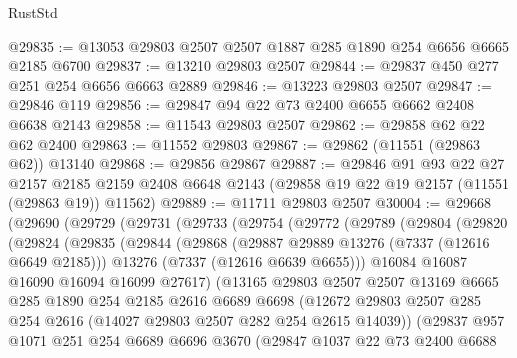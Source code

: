 \begin{lexlean}{RustStd}
\begin{coremodule}
@29835 := @13053 @29803 @2507 @2507 @1887 @285 @1890 @254 @6656 @6665 @2185 @6700
@29837 := @13210 @29803 @2507
@29844 := @29837 @450 @277 @251 @254 @6656 @6663 @2889
@29846 := @13223 @29803 @2507
@29847 := @29846 @119
@29856 := @29847 @94 @22 @73 @2400 @6655 @6662 @2408 @6638 @2143
@29858 := @11543 @29803 @2507
@29862 := @29858 @62 @22 @62 @2400
@29863 := @11552 @29803
@29867 := @29862 (@11551 (@29863 @62)) @13140
@29868 := @29856 @29867
@29887 := @29846
    @91
    @93
    @22
    @27
    @2157
    @2185
    @2159
    @2408
    @6648
    @2143
    (@29858 @19 @22 @19 @2157 (@11551 (@29863 @19)) @11562)
@29889 := @11711 @29803 @2507
@30004 := @29668
    (@29690
      (@29729
        (@29731
          (@29733
            (@29754
              (@29772
                (@29789
                  (@29804
                    (@29820
                      (@29824
                        (@29835
                          (@29844
                            (@29868
                              (@29887 @29889 @13276 (@7337 (@12616 @6649 @2185)))
                              @13276
                              (@7337 (@12616 @6639 @6655)))
                            @16084
                            @16087
                            @16090
                            @16094
                            @16099
                            @27617)
                          (@13165
                            @29803
                            @2507
                            @2507
                            @13169
                            @6665
                            @285
                            @1890
                            @254
                            @2185
                            @2616
                            @6689
                            @6698
                            (@12672
                              @29803
                              @2507
                              @285
                              @254
                              @2616
                              (@14027 @29803 @2507 @282 @254 @2615 @14039))
                            (@29837
                              @957
                              @1071
                              @251
                              @254
                              @6689
                              @6696
                              @3670
                              (@29847
                                @1037
                                @22
                                @73
                                @2400
                                @6688

\end{coremodule}
\end{lexlean}
